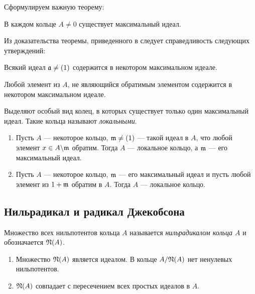     Сформулируем важную теорему:
    \begin{Theorem}{\cite{A-M}}
        В каждом кольце $A \neq 0$ существует максимальный идеал.
    \end{Theorem}
    Из доказательства теоремы, приведенного в \cite{A-M} следует справедливость следующих утверждений:
    \begin{Corollary} {\cite{A-M}} 
        Всякий идеал $\mathfrak{a} \neq (1)$ содержится в некотором максимальном идеале.
    \end{Corollary}
    \begin{Corollary} \cite{A-M}
        Любой элемент из $A$, не являющийся обратимым элементом содержится в некотором максимальном идеале.
    \end{Corollary}

    Выделяют особый вид колец, в которых существует только один максимальный идеал. Такие кольца называют \textit{локальными}.
    
    \begin{Theorem}{\cite{A-M}}
        \begin{enumerate}
            \item Пусть $A$ --- некоторое кольцо, $\mathfrak{m} \neq (1)$ --- такой идеал в $A$, что любой элемент $x \in A \backslash \mathfrak{m}$ обратим. 
            Тогда $A$ --- локальное кольцо, а $\mathfrak{m}$ --- его максимальный идеал.
            \item Пусть $A$ --- некоторое кольцо, $\mathfrak{m}$ --- его максимальный идеал и пусть любой элемент из $1 + \mathfrak{m}$ обратим в $A$. Тогда $A$ --- локальное кольцо.
        \end{enumerate}
    \end{Theorem}

    \subsection{Нильрадикал и радикал Джекобсона}

    \begin{Def}
        Множество всех нильпотентов кольца $A$ называется \textit{нильрадикалом кольца $A$} и обозначается $\mathfrak{N}(A)$.
    \end{Def}

    \begin{Theorem}{\cite{A-M}}
        \begin{enumerate}
            \item Множество $\mathfrak{N}(A)$ является идеалом. В кольце $A/\mathfrak{N}(A)$ нет ненулевых нильпотентов.
            \item $\mathfrak{N}(A)$ совпадает с пересечением всех простых идеалов в $A$.
        \end{enumerate}
    \end{Theorem}

